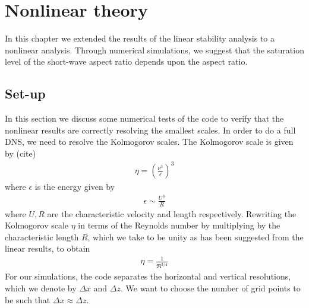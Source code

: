 %
% 
\chapter{Nonlinear theory}

In this chapter we extended the results of the linear stability analysis to a nonlinear analysis. Through numerical simulations, we suggest that the saturation level of the short-wave aspect ratio depends upon the aspect ratio. 


\section{Set-up}
In this section we discuss some numerical tests of the code to verify that the nonlinear results are correctly resolving the smallest scales. 
In order to do a full DNS, we need to resolve the Kolmogorov scales. The Kolmogorov scale is given by (cite)
\begin{align}
\eta = \left(\frac{\nu^{3}}{\epsilon}\right)^{3}
\end{align}
where $\epsilon$ is the energy given by
\begin{align}
\epsilon \sim \frac{U^{3}}{R} 
\end{align}
where $U,R$ are the characteristic velocity and length respectively. Rewriting the Kolmogorov scale $\eta$ in terms of the Reynolds number by multiplying by the characteristic length $R$, which we take to be unity as has been suggested from the linear results, to obtain
\begin{align}
\eta = \frac{1}{\Re^{3/4}}
\end{align}
For our simulations, the code separates the horizontal and vertical resolutions, which we denote by $\Delta x$ and $\Delta z$. We want to choose the number of grid points to be such that $\Delta x \approx \Delta z$. 

